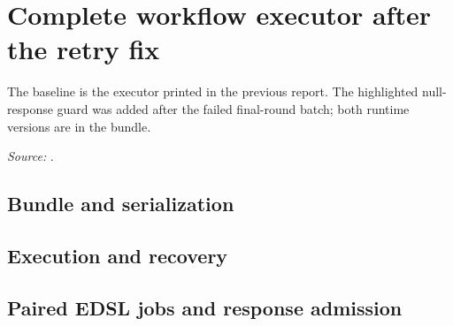 \section{Complete workflow executor after the retry fix}
The baseline is the executor printed in the previous report. The highlighted null-response guard was added after the failed final-round batch; both runtime versions are in the bundle.
\par\textit{Source:} .
\def\activefile{executor}
\subsection{Bundle and serialization}

\subsection{Execution and recovery}

\subsection{Paired EDSL jobs and response admission}

